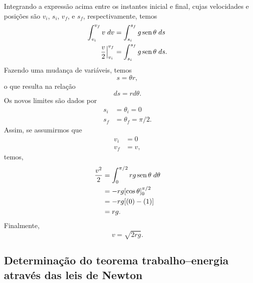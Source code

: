 Integrando a expressão acima entre os instantes inicial e final, cujas velocidades e posições são $v_i$, $s_i$, $v_f$, e $s_f$, respectivamente, temos
\begin{align}
    \int_{v_i}^{v_f} v \;dv &= \int_{s_i}^{s_f} g \operatorname{sen} \theta \;ds \\
    \frac{v}{2}\Big|_{v_i}^{v_f} &= \int_{s_i}^{s_f} g \operatorname{sen} \theta \;ds.
\end{align}
%
Fazendo uma mudança de variáveis, temos
\begin{equation}
    s = \theta r,
\end{equation}
%
o que resulta na relação
\begin{equation}
    ds = r d\theta.
\end{equation}
%
Os novos limites são dados por
\begin{align}
    s_i &= \theta_i = 0\\
    s_f &= \theta_f = \pi/2.
\end{align}
%
Assim, se assumirmos que
\begin{align}
    v_i &= 0 \\
    v_f &= v,
\end{align}
%
temos,
\begin{align}
    \frac{v^2}{2} &= \int_{0}^{\pi/2} rg \operatorname{sen}\theta \;d\theta \\
    &= -rg [\cos\theta]_{0}^{\pi/2} \\
    &= -rg [(0) - (1)] \\
    &= rg.
\end{align}
%
Finalmente,
\begin{equation}
    v = \sqrt{2rg}.
\end{equation} 

\subsection{Determinação do teorema trabalho--energia através das leis de Newton}

